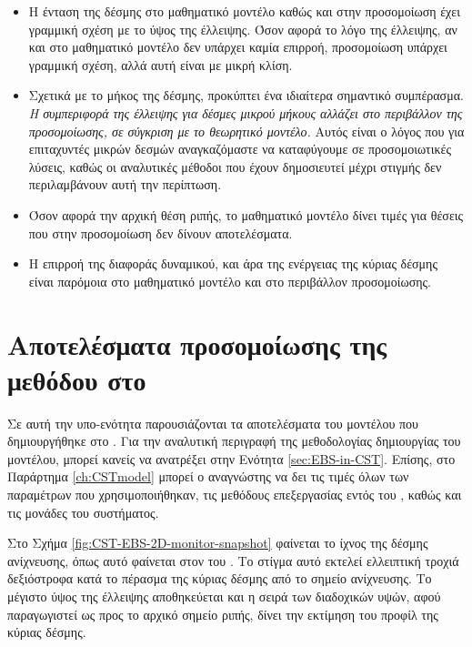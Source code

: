 \begin{itemize}
\item Η ένταση της δέσμης στο μαθηματικό μοντέλο καθώς και στην προσομοίωση έχει γραμμική σχέση με το ύψος της έλλειψης. 
Όσον αφορά το λόγο της έλλειψης, αν και στο μαθηματικό μοντέλο δεν υπάρχει καμία επιρροή, προσομοίωση υπάρχει γραμμική σχέση, αλλά αυτή είναι με μικρή κλίση.

\item Σχετικά με το μήκος της δέσμης, προκύπτει ένα ιδιαίτερα σημαντικό συμπέρασμα.
\emph{Η συμπεριφορά της έλλειψης για δέσμες μικρού μήκους αλλάζει στο περιβάλλον της προσομοίωσης, σε σύγκριση με το θεωρητικό μοντέλο.}
Αυτός είναι ο λόγος που για επιταχυντές μικρών δεσμών αναγκαζόμαστε να καταφύγουμε σε προσομοιωτικές λύσεις, καθώς οι αναλυτικές μέθοδοι που έχουν δημοσιευτεί μέχρι στιγμής δεν περιλαμβάνουν αυτή την περίπτωση.

\item Όσον αφορά την αρχική θέση ριπής, το μαθηματικό μοντέλο δίνει τιμές για θέσεις που στην προσομοίωση δεν δίνουν αποτελέσματα.

\item Η επιρροή της διαφοράς δυναμικού, και άρα της ενέργειας της κύριας δέσμης είναι παρόμοια στο μαθηματικό μοντέλο και στο περιβάλλον προσομοίωσης.
\end{itemize}


\section{Αποτελέσματα προσομοίωσης της μεθόδου στο }

Σε αυτή την υπο-ενότητα παρουσιάζονται τα αποτελέσματα του μοντέλου που δημιουργήθηκε στο .
Για την αναλυτική περιγραφή της μεθοδολογίας δημιουργίας του μοντέλου, μπορεί κανείς να ανατρέξει στην Ενότητα \ref{sec:EBS-in-CST}.
Επίσης, στο Παράρτημα \ref{ch:CSTmodel} μπορεί ο αναγνώστης να δει τις τιμές όλων των παραμέτρων που χρησιμοποιήθηκαν, τις μεθόδους επεξεργασίας εντός του , καθώς και τις μονάδες του συστήματος.

Στο Σχήμα \ref{fig:CST-EBS-2D-monitor-snapshot} φαίνεται το ίχνος της δέσμης ανίχνευσης, όπως αυτό φαίνεται στον  του . 
Το στίγμα αυτό εκτελεί ελλειπτική τροχιά δεξιόστροφα κατά το πέρασμα της κύριας δέσμης από το σημείο ανίχνευσης.
Το μέγιστο ύψος της έλλειψης αποθηκεύεται και η σειρά των διαδοχικών υψών, αφού παραγωγιστεί ως προς το αρχικό σημείο ριπής, δίνει την εκτίμηση του προφίλ της κύριας δέσμης.


